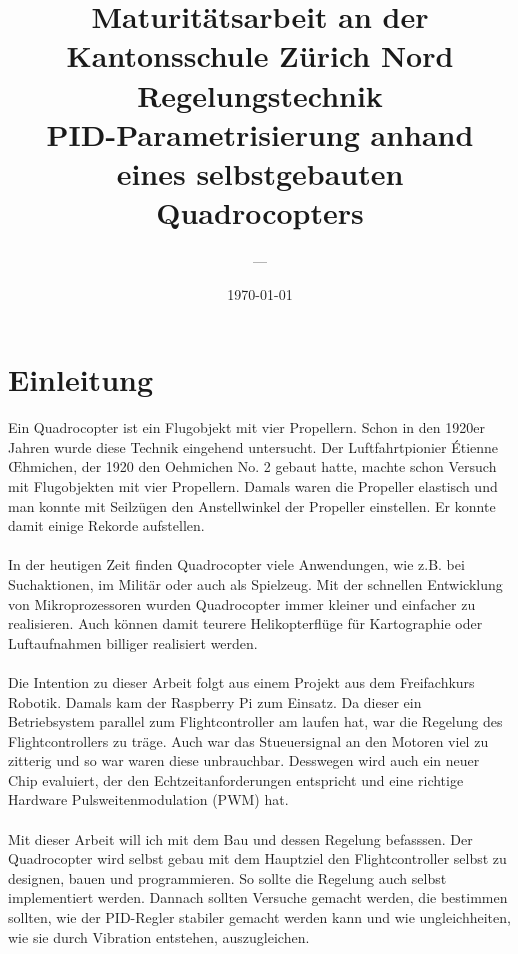 \documentclass[12pt,a4paper, ngerman]{article}
\begin{document}
\title{\large Maturitätsarbeit an der Kantonsschule Zürich Nord \\ \Huge Regelungstechnik \\ \huge PID-Parametrisierung anhand eines selbstgebauten Quadrocopters}
\author{---}
\date{\today}
\maketitle
{}





\newpage
\clearpage
{}
\tableofcontents
\newpage
{}

\section{Einleitung}
Ein Quadrocopter ist ein Flugobjekt mit vier Propellern. Schon in den 1920er Jahren wurde diese Technik eingehend untersucht. Der Luftfahrtpionier Étienne \OE hmichen, der 1920 den Oehmichen No. 2 gebaut hatte, machte schon Versuch mit Flugobjekten mit vier Propellern. Damals waren die Propeller elastisch und man konnte mit Seilzügen den Anstellwinkel der Propeller einstellen. Er konnte damit einige Rekorde aufstellen.\cite{website:Wikipedia_Quadrocopter}\\ \\
In der heutigen Zeit finden Quadrocopter viele Anwendungen, wie z.B. bei Suchaktionen, im Militär oder auch als Spielzeug. Mit der schnellen Entwicklung von Mikroprozessoren wurden Quadrocopter immer kleiner und einfacher zu realisieren. Auch können damit teurere Helikopterflüge für Kartographie oder Luftaufnahmen billiger realisiert werden.\cite{website:Wikipedia_Quad_Einsatz}\\ \\
Die Intention zu dieser Arbeit folgt aus einem Projekt aus dem Freifachkurs Robotik. Damals kam der Raspberry Pi zum Einsatz. Da dieser ein Betriebsystem parallel zum Flightcontroller am laufen hat, war die Regelung des Flightcontrollers zu träge. Auch war das Stueuersignal an den Motoren viel zu zitterig und so war waren diese unbrauchbar. Desswegen wird auch ein neuer Chip evaluiert, der den Echtzeitanforderungen entspricht und eine richtige Hardware Pulsweitenmodulation (PWM) hat. \\ \\
\iffalse
Mit dieser Arbeit will ich mit dem Bau und dessen Regelung befasssen. Der Quadrocopter wird selbst gebau mit dem Hauptziel den Flightcontroller selbst zu designen, bauen und programmieren. So sollte die Regelung auch selbst implementiert werden. Dannach sollten Versuche gemacht werden, die bestimmen sollten, wie der PID-Regler stabiler gemacht werden kann und wie ungleichheiten, wie sie durch Vibration entstehen, auszugleichen. 
\end{document}
